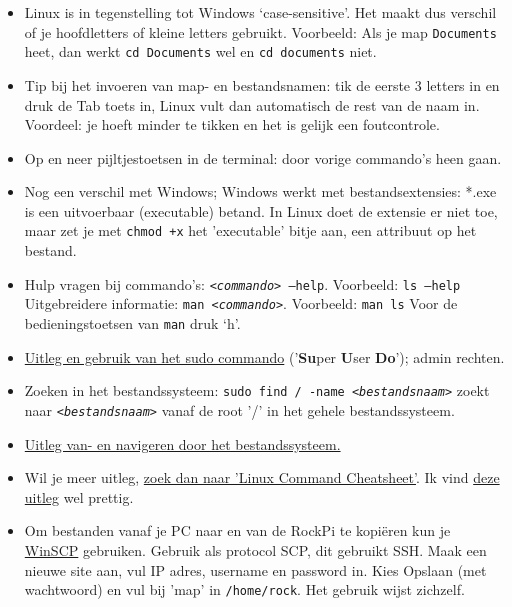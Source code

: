 \begin{itemize}
	\item 
	Linux is in tegenstelling tot Windows ‘case-sensitive’. Het maakt dus verschil of je hoofdletters of kleine letters gebruikt. Voorbeeld: Als je map \texttt{Documents} heet, dan werkt \texttt{cd Documents} wel en \texttt{cd documents} niet.
	\item 
	Tip bij het invoeren van map- en bestandsnamen: tik de eerste 3 letters in en druk de Tab toets in, Linux vult dan automatisch de rest van de naam in. Voordeel: je hoeft minder te tikken en het is gelijk een foutcontrole.
	\item 
	Op en neer pijltjestoetsen in de terminal: door vorige commando's heen gaan.
	\item
	Nog een verschil met Windows; Windows werkt met bestandsextensies: *.exe is een uitvoerbaar (executable) betand. In Linux doet de extensie er niet toe, maar zet je met \texttt{chmod +x} het 'executable' bitje aan, een attribuut op het bestand.
	\item  
	Hulp vragen bij commando’s: \texttt{<\textit{commando}> --help}. Voorbeeld: \texttt{ls  --help}
	Uitgebreidere informatie: \texttt{man <\textit{commando}>}. Voorbeeld: \texttt{man ls}\newline
	Voor de bedieningstoetsen van \texttt{man} druk ‘h’.
	\item 
	\href{https://phoenixnap.com/kb/linux-sudo-command}{Uitleg en gebruik van het sudo commando}  ('\textbf{Su}per \textbf{U}ser \textbf{Do}'); admin rechten.
	\item
	Zoeken in het bestandssysteem: \texttt{sudo find / -name \textit{<bestandsnaam>}}
	zoekt naar \texttt{\textit{<bestandsnaam>}} vanaf de root '/' in het gehele bestandssysteem.
	\item 
	\href{https://linuxconfig.org/filesystem-basics}{Uitleg van- en navigeren door het bestandssysteem.}
	\item
	Wil je meer uitleg, \href{https://duckduckgo.com/?q=linux+command+cheatsheet}{zoek dan naar 'Linux Command Cheatsheet'}. \newline
	Ik vind \href{https://linuxconfig.org/linux-commands-cheat-sheet}{deze uitleg} wel prettig.
	\item 
	Om bestanden vanaf je PC naar en van de RockPi te kopiëren kun je \href{https://winscp.net/eng/download.php}{WinSCP} gebruiken. Gebruik als protocol SCP, dit gebruikt SSH. Maak een nieuwe site aan, vul IP adres, username en password in. Kies Opslaan (met wachtwoord) en vul bij 'map' in \texttt{/home/rock}. Het gebruik wijst zichzelf.
\end{itemize}


